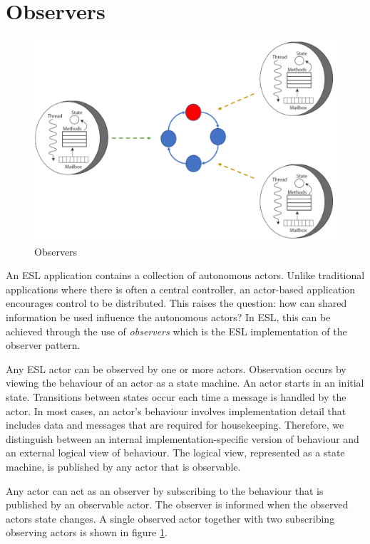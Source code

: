 \documentclass[5p,times]{elsarticle}
\begin{document}
\section{Observers}

\label{sec:observers}

\begin{figure}
\includegraphics[width=0.9\columnwidth]{observer}
\caption{Observers}
\label{fig:observers}
\end{figure}

An ESL application contains a collection of autonomous actors. Unlike traditional applications where there is often a central controller, an actor-based application encourages control to be distributed. This raises the question: how can shared information be used influence the autonomous actors? In ESL, this can be achieved through the use of {\it observers} which is the ESL implementation of the observer pattern.

Any ESL actor can be observed by one or more actors. Observation occurs by viewing the behaviour of an actor as a state machine. An actor starts in an initial state. Transitions between states occur each time a message is handled by the actor. In most cases, an actor's behaviour involves implementation detail that includes data and messages that are required for housekeeping. Therefore, we distinguish between an internal implementation-specific version of behaviour and an external logical view of behaviour. The logical view, represented as a state machine, is published by any actor that is observable. 

Any actor can act as an observer by subscribing to the behaviour that is published by an observable actor. The observer is informed when the observed actors state changes. A single observed actor together with two subscribing observing actors is shown in figure \ref{fig:observers}. 
\end{document}
